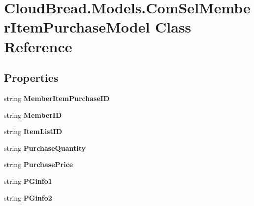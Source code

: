 \hypertarget{a00066}{}\section{Cloud\+Bread.\+Models.\+Com\+Sel\+Member\+Item\+Purchase\+Model Class Reference}
\label{a00066}
\subsection*{Properties}
\begin{DoxyCompactItemize}
\item 
string {\bfseries Member\+Item\+Purchase\+ID}\hypertarget{a00066_a366a68004f1730463f8490dd61e6783c}{}\label{a00066_a366a68004f1730463f8490dd61e6783c}

\item 
string {\bfseries Member\+ID}\hypertarget{a00066_ab3beeafd134a9e6ad1fefaa1bf21cd7a}{}\label{a00066_ab3beeafd134a9e6ad1fefaa1bf21cd7a}

\item 
string {\bfseries Item\+List\+ID}\hypertarget{a00066_a9d2e0f2eb0dfa05201785ff820f7f64c}{}\label{a00066_a9d2e0f2eb0dfa05201785ff820f7f64c}

\item 
string {\bfseries Purchase\+Quantity}\hypertarget{a00066_a91fdfd157de1d5053d8ff772cd457500}{}\label{a00066_a91fdfd157de1d5053d8ff772cd457500}

\item 
string {\bfseries Purchase\+Price}\hypertarget{a00066_a0db74a2c5f79715a628f22dfcf76cf43}{}\label{a00066_a0db74a2c5f79715a628f22dfcf76cf43}

\item 
string {\bfseries P\+Ginfo1}\hypertarget{a00066_a9c66a24b2e8e885c742eb906a66473d6}{}\label{a00066_a9c66a24b2e8e885c742eb906a66473d6}

\item 
string {\bfseries P\+Ginfo2}\hypertarget{a00066_a0ecfcdd44f08f2fb660b53abced4236b}{}\label{a00066_a0ecfcdd44f08f2fb660b53abced4236b}


\end{DoxyCompactItemize}
